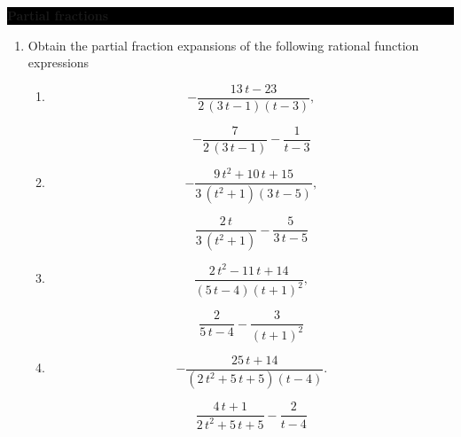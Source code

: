 \documentclass[oneside,10pt]{amsart}
\newcommand{\cbox}[1]{\colorbox{black}{\begin{minipage}{\linewidth}\color{white}\sffamily #1 \end{minipage}}}
\newcommand{\topic}[1]{\cbox{\textbf{#1}}}
\newcounter{pass}
\begin{document}
\topic{Partial fractions}
\begin{enumerate}
\setcounter{enumi}{\value{pass}}
\item
Obtain the partial fraction expansions of the following rational function expressions
\begin{enumerate}
\item
$$-\frac{13 \, t - 23}{2 \, {\left(3 \, t - 1\right)} {\left(t - 3\right)}},$$
\begin{solution}
$$-\frac{7}{2 \, {\left(3 \, t - 1\right)}} - \frac{1}{t - 3}$$
\end{solution}
\item
$$-\frac{9 \, t^{2} + 10 \, t + 15}{3 \, {\left(t^{2} + 1\right)} {\left(3 \, t - 5\right)}},$$
\begin{solution}
$$\frac{2 \, t}{3 \, {\left(t^{2} + 1\right)}} - \frac{5}{3 \, t - 5}$$
\end{solution}
\item
$$\frac{2 \, t^{2} - 11 \, t + 14}{{\left(5 \, t - 4\right)} {\left(t + 1\right)}^{2}},$$
\begin{solution}
$$\frac{2}{5 \, t - 4} - \frac{3}{{\left(t + 1\right)}^{2}}$$
\end{solution}
\item
$$-\frac{25 \, t + 14}{{\left(2 \, t^{2} + 5 \, t + 5\right)} {\left(t - 4\right)}}.$$
\begin{solution}
$$\frac{4 \, t + 1}{2 \, t^{2} + 5 \, t + 5} - \frac{2}{t - 4}$$
\end{solution}
\end{enumerate}
\end{enumerate}
\end{document}
